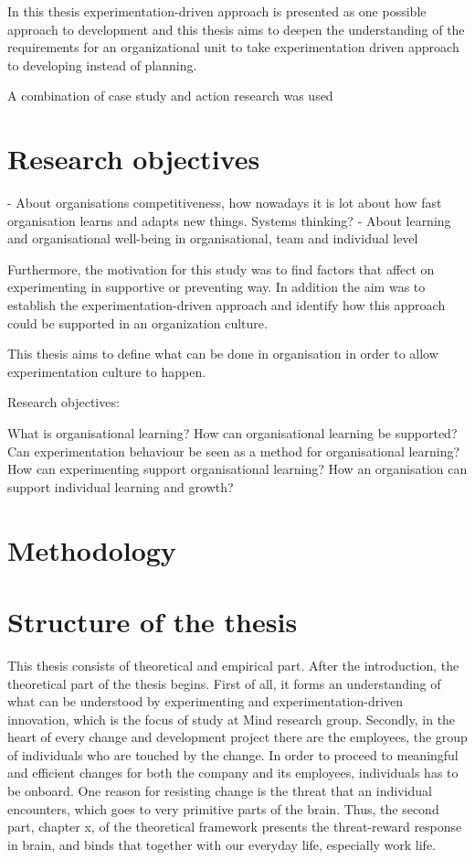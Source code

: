 In this thesis experimentation-driven approach is presented as one possible approach to development and this thesis aims to deepen the understanding of the 
requirements for an organizational unit to take experimentation driven approach to developing instead of planning. 

A combination of case study and action research was used 



\section{Research objectives}
- About organisations competitiveness, how nowadays it is lot about how fast organisation learns and adapts new things. Systems thinking? 
- About learning and organisational well-being in organisational, team and individual level

Furthermore, the motivation for this study was to find factors that affect on experimenting in supportive or preventing way. In addition the aim was to establish 
the experimentation-driven approach and identify how this approach could be supported in an organization culture. 

This thesis aims to define what can be done in organisation in order to allow experimentation culture to happen. 

Research objectives: 

What is organisational learning? 
How can organisational learning be supported? 
Can experimentation behaviour be seen as a method for organisational learning? 
How can experimenting support organisational learning? 
How an organisation can support individual learning and growth? 

\section{Methodology}

\section{Structure of the thesis}
This thesis consists of theoretical and empirical part. After the introduction, the theoretical part of the thesis begins. First of all, it forms an understanding 
of what can be understood by experimenting and experimentation-driven innovation, which is the focus of study at Mind research group. Secondly, in the heart of 
every change and development project there are the employees, the group of individuals who are touched by the change. In order to proceed to meaningful and efficient 
changes for both the company and its employees, individuals has to be onboard.  One reason for resisting change is the threat that an individual encounters, which 
goes to very primitive parts of the brain. Thus, the second part, chapter x, of the theoretical framework presents the threat-reward response in brain, and binds 
that together with our everyday life, especially work life. 

